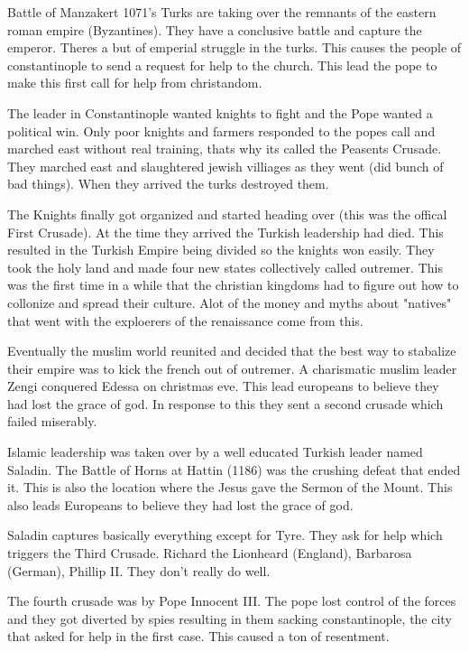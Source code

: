 \documentclass{article}
\begin{document}
Battle of Manzakert 1071's Turks are taking over the remnants of the eastern roman empire (Byzantines). They have a conclusive battle and capture the emperor. Theres a but of emperial struggle in the turks. This causes the people of constantinople to send a request for help to the church. This lead the pope to make this first call for help from christandom.

The leader in Constantinople wanted knights to fight and the Pope wanted a political win. Only poor knights and farmers responded to the popes call and marched east without real training, thats why its called the Peasents Crusade. They marched east and slaughtered jewish villiages as they went (did bunch of bad things). When they arrived the turks destroyed them.

The Knights finally got organized and started heading over (this was the offical First Crusade). At the time they arrived the Turkish leadership had died. This resulted in the Turkish Empire being divided so the knights won easily. They took the holy land and made four new states collectively called outremer. This was the first time in a while that the christian kingdoms had to figure out how to collonize and spread their culture. Alot of the money and myths about "natives" that went with the exploerers of the renaissance come from this.

Eventually the muslim world reunited and decided that the best way to stabalize their empire was to kick the french out of outremer. A charismatic muslim leader Zengi conquered Edessa on christmas eve. This lead europeans to believe they had lost the grace of god. In response to this they sent a second crusade which failed miserably.

Islamic leadership was taken over by a well educated Turkish leader named Saladin. The Battle of Horns at Hattin (1186) was the crushing defeat that ended it. This is also the location where the Jesus gave the Sermon of the Mount. This also leads Europeans to believe they had lost the grace of god.

Saladin captures basically everything except for Tyre. They ask for help which triggers the Third Crusade. Richard the Lionheard (England), Barbarosa (German), Phillip II. They don't really do well.

The fourth crusade was by Pope Innocent III. The pope lost control of the forces and they got diverted by spies resulting in them sacking constantinople, the city that asked for help in the first case. This caused a ton of resentment.
\end{document}
